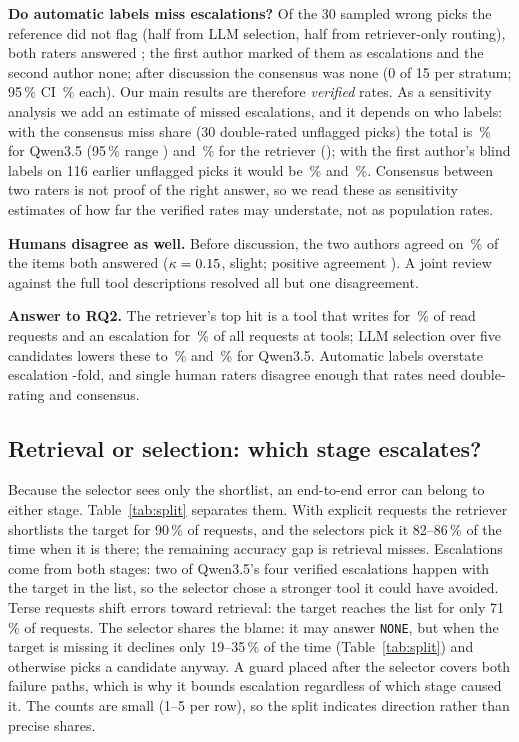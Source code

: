 \textbf{Do automatic labels miss escalations?} Of the 30 sampled wrong picks the reference
did not flag (half from LLM selection, half from retriever-only routing), both raters answered
\IndUnN; the first author marked \IndUnAuthorYes{} of them as escalations and the second author none; after discussion the consensus
was none (0 of 15 per stratum; 95\,\% CI \MissSelCI\,\% each). Our main results are therefore \emph{verified} rates. As a sensitivity analysis we add an
estimate of missed escalations, and it depends on who labels: with the consensus miss share (30 double-rated unflagged picks) the
total is \EstQPlain\,\% for Qwen3.5 (95\,\% range \EstQPlainRange) and \EstRet\,\% for the retriever
(\EstRetRange); with the first author's blind labels on 116 earlier unflagged picks it would be \EstQPlainAuthor\,\% and \EstRetAuthor\,\%.
Consensus between two raters is not proof of the right answer, so we read these as sensitivity estimates of how
far the verified rates may understate, not as population rates.

\textbf{Humans disagree as well.} Before discussion, the two authors agreed on
\IndAgree\,\% of the \IndN{} items both answered ($\kappa=0.15$, slight; positive agreement \IndPos).
A joint review against the full tool descriptions resolved all but one disagreement.

\textbf{Answer to RQ2.} The retriever's top hit is a tool that writes for \RWRetRate\,\% of read
requests and an escalation for \GRNonePoolConf\,\% of all requests at \NumPoolTools{} tools; LLM
selection over five candidates lowers these to \RWQPlainRate\,\% and \SelQPlainPoolConf\,\% for
Qwen3.5. Automatic labels overstate escalation \EscOverstate-fold, and single human raters disagree
enough that rates need double-rating and consensus.

\subsection{Retrieval or selection: which stage escalates?}\label{sec:split}
Because the selector sees only the shortlist, an end-to-end error can belong to either stage.
Table~\ref{tab:split} separates them. With explicit requests the retriever shortlists the target
for 90\,\% of requests, and the selectors pick it 82--86\,\% of the time when it is there; the
remaining accuracy gap is retrieval misses. Escalations come from both stages: two of Qwen3.5's four
verified escalations happen with the target in the list, so the selector chose a stronger tool
it could have avoided. Terse requests shift errors toward retrieval: the target reaches the
list for only 71\,\% of requests. The selector shares the blame: it may answer \texttt{NONE}, but when the target is missing it
declines only 19--35\,\% of the time (Table~\ref{tab:split}) and otherwise picks a candidate anyway. A guard placed after
the selector covers both failure paths, which is why it bounds escalation regardless of which stage
caused it. The counts are small (1--5 per row), so the split indicates direction rather than precise
shares.

